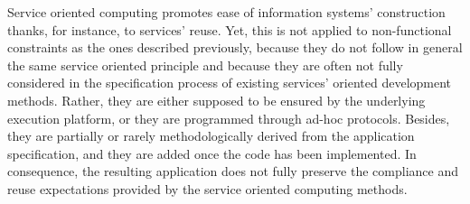 Service oriented computing promotes ease of information systems' construction thanks, for instance, to services' reuse. Yet, this is not applied to non-functional constraints as the ones described previously, because they do not follow in general the same service oriented principle and because they are often not fully considered in the specification process of existing services' oriented development methods. Rather, they   are either supposed to be ensured by the underlying execution platform, or they are programmed through ad-hoc protocols. Besides,  they are partially or rarely methodologically derived from the application specification, and they are added once the code has been implemented. In consequence, the resulting application does not fully preserve the compliance and reuse expectations provided by the service oriented computing methods.


